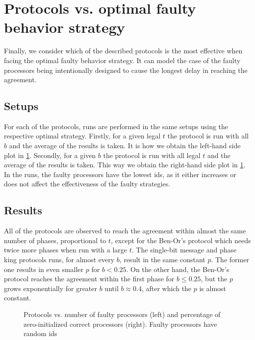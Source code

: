 \section{Protocols vs. optimal faulty behavior strategy}
Finally, we consider which of the described protocols is the most effective when facing the optimal faulty behavior strategy. It can model the case of the faulty processors being intentionally designed to cause the longest delay in reaching the agreement.
\subsection{Setups}
For each of the protocols, runs are performed in the same setups using the respective optimal strategy. Firstly, for a given legal $t$ the protocol is run with all $b$ and the average of the results is taken. It is how we obtain the left-hand side plot in \cref{fig:plot4}. Secondly, for a given $b$ the protocol is run with all legal $t$ and the average of the results is taken. This way we obtain the right-hand side plot in \cref{fig:plot4}. In the runs, the faulty processors have the lowest ids, as it either increases or does not affect the effectiveness of the faulty strategies.
\subsection{Results}
All of the protocols are observed to reach the agreement within almost the same number of phases, proportional to $t$, except for the Ben-Or's protocol which needs twice more phases when run with a large $t$. The single-bit message and phase king protocols runs, for almost every $b$, result in the same constant $p$. The former one results in even smaller $p$ for $b<0.25$. On the other hand, the Ben-Or's protocol reaches the agreement within the first phase for $b\leq0.25$, but the $p$ grows exponentially for greater $b$ until $b\approx0.4$, after which the $p$ is almost constant.

\begin{figure}[H]
    \caption{Protocols vs. number of faulty processors (left) and percentage of zero-initialized correct processors (right). Faulty processors have random ids }
    \begin{center}
        
    \end{center}\label{fig:plot4}
\end{figure}